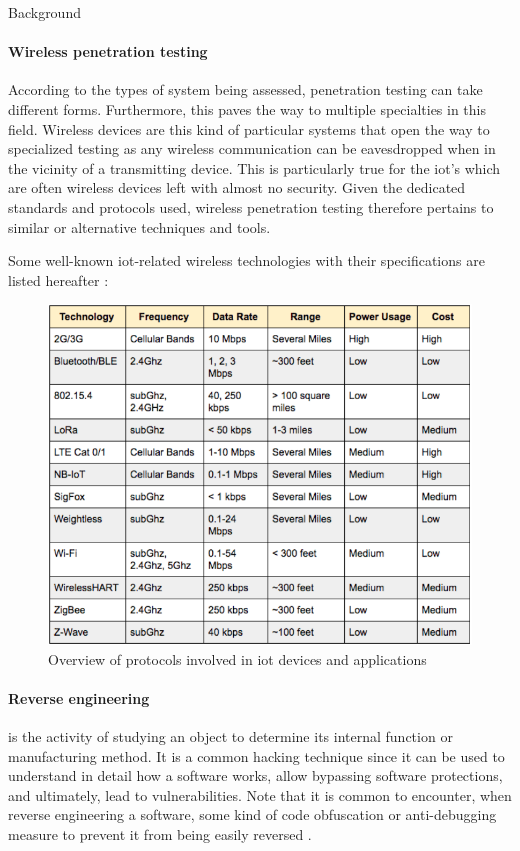 \begin{chaptercover}{Background}
\paragraph{Wireless penetration testing} According to the types of system being assessed, penetration testing can take different forms. Furthermore, this paves the way to multiple specialties in this field. Wireless devices are this kind of particular systems that open the way to specialized testing as any wireless communication can be eavesdropped when in the vicinity of a transmitting device. This is particularly true for the \acrshort{iot}'s which are often wireless devices left with almost no security. Given the dedicated standards and protocols used, wireless penetration testing therefore pertains to similar or alternative techniques and tools.

Some well-known \acrshort{iot}-related wireless technologies with their specifications are listed hereafter :
\begin{figure}[H]
  \centering
  \includegraphics[width=.7\linewidth]{figures/wireless-technologies}
  \caption{Overview of protocols involved in \acrshort{iot} devices and applications \cite{iot-protocols}}
  \label{fig:wireless-technologies}
\end{figure}

\paragraph{Reverse engineering} is the activity of studying an object to determine its internal function or manufacturing method. It is a common hacking technique since it can be used to understand in detail how a software works, allow bypassing software protections, and ultimately, lead to vulnerabilities. Note that it is common to encounter, when reverse engineering a software, some kind of code obfuscation \cite{code-obfuscation} or anti-debugging measure to prevent it from being easily reversed \cite{anti-debugging}.


\end{chaptercover}
